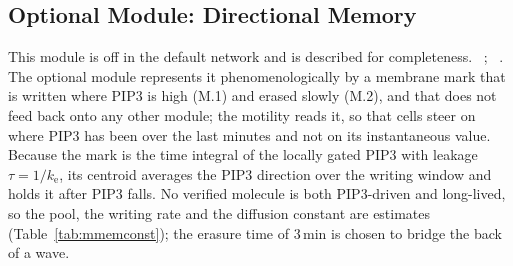 \subsection{Optional Module: Directional Memory}\label{sec:mmem}
This module is off in the default network and is described for completeness.
~\cite{skoge2014}; ~\cite{skoge2014}.
The optional module represents it phenomenologically by a membrane mark that is written where PIP3 is high (M.1) and erased slowly (M.2), and that does not feed back onto any other module; the motility reads it, so that cells steer on where PIP3 has been over the last minutes and not on its instantaneous value.
Because the mark is the time integral of the locally gated PIP3 with leakage $\tau=1/k_\mathrm{e}$, its centroid averages the PIP3 direction over the writing window and holds it after PIP3 falls.
No verified molecule is both PIP3-driven and long-lived, so the pool, the writing rate and the diffusion constant are estimates (Table~\ref{tab:mmemconst}); the erasure time of 3\,min is chosen to bridge the back of a wave.



